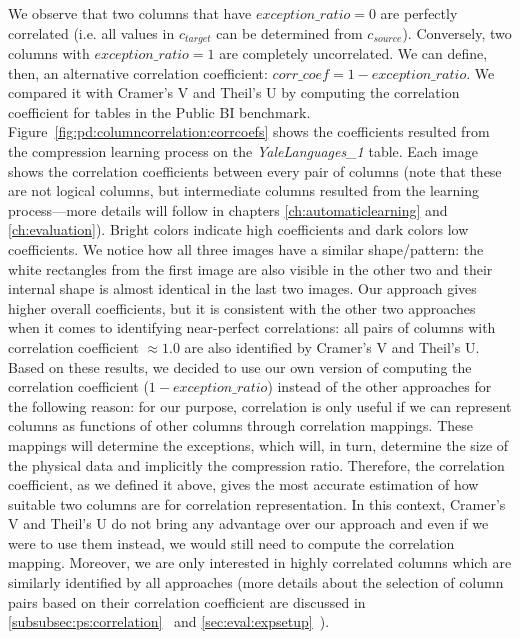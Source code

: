 We observe that two columns that have \(exception\_ratio = 0\) are perfectly correlated (i.e. all values in \(c_{target}\) can be determined from \(c_{source}\)). Conversely, two columns with \(exception\_ratio = 1\) are completely uncorrelated. We can define, then, an alternative correlation coefficient: 
\(\mathit{corr\_coef} = 1 - exception\_ratio\). We compared it with Cramer's V and Theil's U by computing the correlation coefficient for tables in the Public BI benchmark. Figure~\ref{fig:pd:columncorrelation:corrcoefs} shows the coefficients resulted from the compression learning process on the \textit{YaleLanguages\_1} table. Each image shows the correlation coefficients between every pair of columns (note that these are not logical columns, but intermediate columns resulted from the learning process---more details will follow in chapters \ref{ch:automaticlearning} and \ref{ch:evaluation}). Bright colors indicate high coefficients and dark colors low coefficients. We notice how all three images have a similar shape/pattern: the white rectangles from the first image are also visible in the other two and their internal shape is almost identical in the last two images. Our approach gives higher overall coefficients, but it is consistent with the other two approaches when it comes to identifying near-perfect correlations: all pairs of columns with correlation coefficient \(\approx{1.0}\) are also identified by Cramer's V and Theil's U. Based on these results, we decided to use our own version of computing the correlation coefficient (\(1 - exception\_ratio\)) instead of the other approaches for the following reason: for our purpose, correlation is only useful if we can represent columns as functions of other columns through correlation mappings. These mappings will determine the exceptions, which will, in turn, determine the size of the physical data and implicitly the compression ratio. Therefore, the correlation coefficient, as we defined it above, gives the most accurate estimation of how suitable two columns are for correlation representation. In this context, Cramer's V and Theil's U do not bring any advantage over our approach and even if we were to use them instead, we would still need to compute the correlation mapping. Moreover, we are only interested in highly correlated columns which are similarly identified by all approaches (more details about the selection of column pairs based on their correlation coefficient are discussed in \ref{subsubsec:ps:correlation}~ and \ref{sec:eval:expsetup}~).

